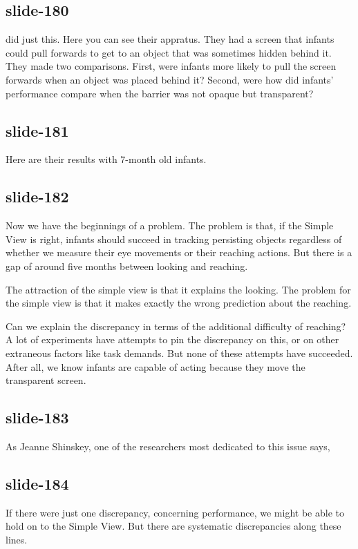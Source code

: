 \documentclass[12pt,\papersize]{extarticle}
\begin{document}
\subsection{slide-180}
\citet{Shinskey:2001fk} did just this.
Here you can see their appratus.
They had a screen that infants could pull forwards to get to an object that was sometimes
hidden behind it.
They made two comparisons.
First, were infants more likely to pull the screen forwards when an object was placed behind it?
Second, were how did infants' performance compare when the barrier was not opaque but transparent?
 
\subsection{slide-181}
Here are their results with 7-month old infants.
 
\subsection{slide-182}
Now we have the beginnings of a problem.
The problem is that, if the Simple View is right, infants should succeed in tracking persisting
objects regardless of whether we measure their eye movements or their reaching actions.
But there is a gap of around five months between looking and reaching.
 
The attraction of the simple view is that it explains the looking.
The problem for the simple view is that it makes exactly the wrong prediction about the reaching.
 
Can we explain the discrepancy in terms of the additional difficulty of reaching?
A lot of experiments have attempts to pin the discrepancy on this, or on other extraneous factors like task demands.
But none of these attempts have succeeded.
After all, we know infants are capable of acting because they move the transparent screen.
 
\subsection{slide-183}
As Jeanne Shinskey, one of the researchers most dedicated to this issue says,
 
\subsection{slide-184}
If there were just one discrepancy, concerning performance, we might be able to hold on to the
Simple View.  But there are systematic discrepancies along these lines.
 
\end{document}
